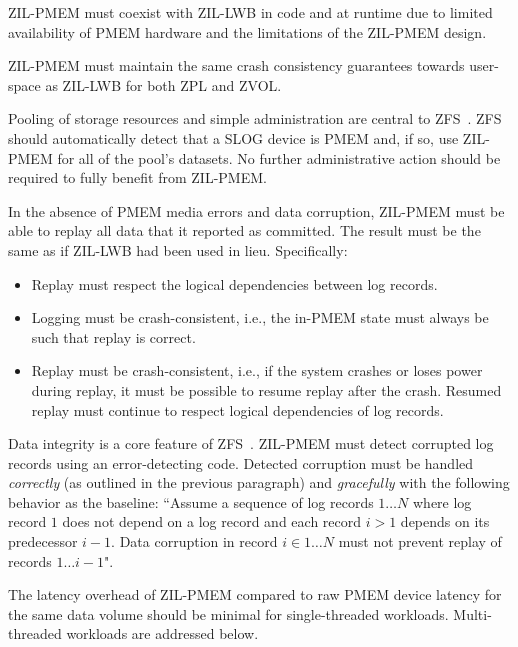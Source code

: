 \documentclass[12pt,a4paper,twoside]{book}
\begin{document}
ZIL-PMEM must coexist with ZIL-LWB in code and at runtime due to limited availability of PMEM hardware and the limitations of the ZIL-PMEM design.

ZIL-PMEM must maintain the same crash consistency guarantees towards user-space as ZIL-LWB for both ZPL and ZVOL.

Pooling of storage resources and simple administration are central to ZFS~\cite{bonwickZettabyteFileSystem2003}.
ZFS should automatically detect that a SLOG device is PMEM and, if so, use ZIL-PMEM for all of the pool’s datasets.
No further administrative action should be required to fully benefit from ZIL-PMEM.

In the absence of PMEM media errors and data corruption, ZIL-PMEM must be able to replay all data that it reported as committed.
The result must be the same as if ZIL-LWB had been used in lieu.
Specifically:
\begin{itemize}[noitemsep,beginpenalty=100000,midpenalty=100000]
    \item Replay must respect the logical dependencies between log records.
    \item Logging must be crash-consistent, i.e., the in-PMEM state must always be such that replay is correct.
    \item Replay must be crash-consistent, i.e., if the system crashes or loses power during replay, it must be possible to resume replay after the crash.
        Resumed replay must continue to respect logical dependencies of log records.
\end{itemize}

Data integrity is a core feature of ZFS~\cite{bonwickZettabyteFileSystem2003}.
ZIL-PMEM must detect corrupted log records using an error-detecting code.
Detected corruption must be handled \textit{correctly} (as outlined in the previous paragraph) and \textit{gracefully} with the following behavior as the baseline:
``Assume a sequence of log records $1 \dots N$ where log record $1$ does not depend on a log record and each record $i > 1$ depends on its predecessor $i-1$.
Data corruption in record $i \in 1 \dots N$ must not prevent replay of records $1 \dots i-1$".

The latency overhead of ZIL-PMEM compared to raw PMEM device latency for the same data volume should be minimal for single-threaded workloads.
Multi-threaded workloads are addressed below.
\end{document}
